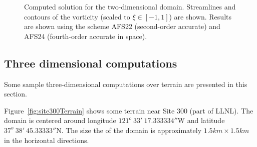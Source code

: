 \documentclass[11pt]{article}
\begin{document}
{\begin{figure}[hbt]
\begin{center}
\caption{Computed solution for the two-dimensional domain. Streamlines and contours of the vorticity (scaled to $\xi\in[-1,1]$)
   are shown. Results are shown using the scheme AFS22 (second-order accurate) and AFS24 (fourth-order accurate in space).
}
\label{fig:site300Flow2d}
\end{center}
\end{figure}
}


\clearpage
\subsection{Three dimensional computations}

Some sample three-dimensional computations over terrain are presented in this section.

Figure~\ref{fig:site300Terrain} shows some terrain near Site 300 (part of LLNL). The domain 
is centered around longitude $121^o~33'~17.333334''$W and latitude $37^o~ 38'~45.33333''$N. 
The size the of the domain is approximately $1.5 km \times 1.5 km$ in the horizontal directions. 

\end{document}

